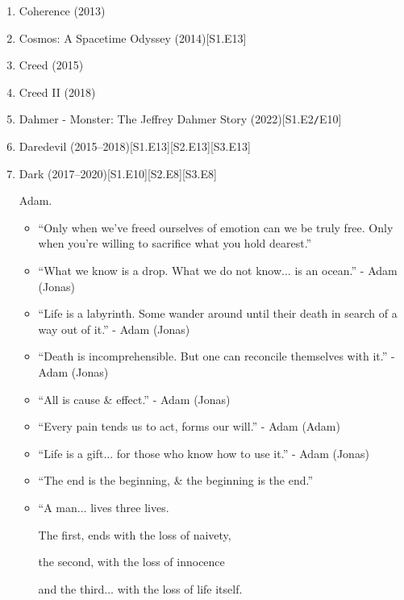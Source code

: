 \documentclass{article}
\begin{document}
\begin{enumerate}
	\item {\sc Coherence} (2013)
	\item {\sc Cosmos: A Spacetime Odyssey} (2014)\hfill[S1.E13]
	\item {\sc Creed} (2015)
	\item {\sc Creed II} (2018)
	\item Dahmer - Monster: The Jeffrey Dahmer Story (2022)\hfill[S1.E2{\tt/}E10]
	\item {\sc Daredevil} (2015--2018)\hfill[S1.E13][S2.E13][S3.E13]
	\item {\sc Dark} (2017--2020)\hfill[S1.E10][S2.E8][S3.E8]

	{\sc Adam.}
	\begin{itemize}
		\item ``Only when we've freed ourselves of emotion can we be truly free. Only when you're willing to sacrifice what you hold dearest.''
		\item ``What we know is a drop. What we do not know$\ldots$ is an ocean.'' - Adam (Jonas)
		\item ``Life is a labyrinth. Some wander around until their death in search of a way out of it.'' - Adam (Jonas)
		\item ``Death is incomprehensible. But one can reconcile themselves with it.'' - Adam (Jonas)
		\item ``All is cause \& effect.'' - Adam (Jonas)
		\item ``Every pain tends us to act, forms our will.'' - Adam (Adam)
		\item ``Life is a gift$\ldots$ for those who know how to use it.'' - Adam (Jonas)
		\item ``The end is the beginning, \& the beginning is the end.''
		\item ``A man$\ldots$ lives three lives.

		The first, ends with the loss of naivety,

		the second, with the loss of innocence

		and the third$\ldots$ with the loss of life itself.


\end{itemize}
\end{enumerate}
\end{document}
